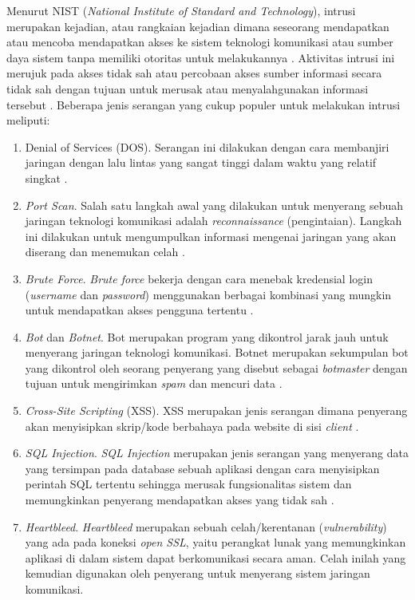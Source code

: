 \documentclass[a4paper,12pt]{report}
\begin{document}
Menurut NIST (\textit{National Institute of Standard and Technology}), intrusi merupakan kejadian, atau rangkaian kejadian dimana seseorang mendapatkan atau mencoba mendapatkan akses ke sistem teknologi komunikasi atau sumber daya sistem tanpa memiliki otoritas untuk melakukannya \cite{nationalinstituteofstandardstechnologyIntrusion}. Aktivitas intrusi ini merujuk pada akses tidak sah atau percobaan akses sumber informasi secara tidak sah dengan tujuan untuk merusak atau menyalahgunakan informasi tersebut \cite{mukkamalaIntrusionDetectionUsing2002}.  Beberapa jenis serangan yang cukup populer untuk melakukan intrusi meliputi:
\begin{enumerate}
	\item Denial of Services (DOS). Serangan ini dilakukan dengan cara membanjiri jaringan dengan lalu lintas yang sangat tinggi dalam waktu yang relatif singkat \cite{hnamteDDoSAttackDetection2024}.
	
	\item \textit{Port Scan}. Salah satu langkah awal yang dilakukan untuk menyerang sebuah jaringan teknologi komunikasi adalah \textit{reconnaissance} (pengintaian). Langkah ini dilakukan untuk mengumpulkan informasi mengenai jaringan yang akan diserang dan menemukan celah \cite{hartpenceCombatingTCPPort2020}.
	
	\item \textit{Brute Force}. \textit{Brute force} bekerja dengan cara menebak kredensial login (\textit{username} dan \textit{password}) menggunakan berbagai kombinasi yang mungkin untuk mendapatkan akses pengguna tertentu \cite{groverEfficientBruteForce2020}. 
	
	\item \textit{Bot} dan \textit{Botnet}. Bot merupakan program yang dikontrol jarak jauh untuk menyerang jaringan teknologi komunikasi. Botnet merupakan sekumpulan bot yang dikontrol oleh seorang penyerang yang disebut sebagai \textit{botmaster} dengan tujuan untuk mengirimkan \textit{spam} dan mencuri data \cite{qureshiBotnetAttacksCharacteristics2023}.
	
	\item \textit{Cross-Site Scripting} (XSS). XSS merupakan jenis serangan dimana penyerang akan menyisipkan skrip/kode berbahaya pada website di sisi \textit{client} \cite{weamieCrossSiteScriptingAttacks2022}.
	
	\item \textit{SQL Injection}. \textit{SQL Injection} merupakan jenis serangan yang menyerang data yang tersimpan pada database sebuah aplikasi dengan cara menyisipkan perintah SQL tertentu sehingga merusak fungsionalitas sistem dan memungkinkan penyerang mendapatkan akses yang tidak sah \cite{paulSQLInjectionAttack2024}\cite{owaspSQLInjection}.
	
	\item \textit{Heartbleed}. \textit{Heartbleed} merupakan sebuah celah/kerentanan (\textit{vulnerability}) yang ada pada koneksi \textit{open SSL}, yaitu perangkat lunak yang memungkinkan aplikasi di dalam sistem dapat berkomunikasi secara aman. Celah inilah yang kemudian digunakan oleh penyerang untuk menyerang sistem jaringan komunikasi.
\end{enumerate}
\end{document}
